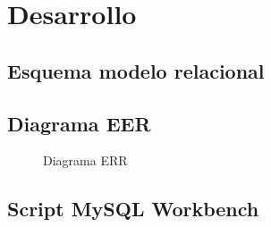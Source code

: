 \chapter{Desarrollo}

\section{Esquema modelo relacional}



\section{Diagrama EER}
\begin{figure}[H]
    \centering
    
    \caption{Diagrama ERR}
    \label{fig:diagrama_err}
\end{figure}

\section{Script MySQL Workbench}


